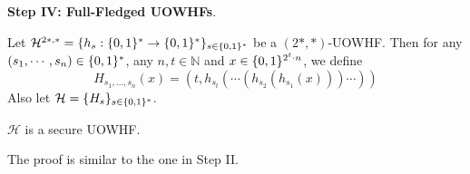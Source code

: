 \noindent\textbf{Step IV: Full-Fledged UOWHFs}. 
\begin{construction}[(a UOWHF)]
Let $\mathcal{H}^{2*, *} = \{h_s:\{0,1\}^{*}\rightarrow\{0,1\}^{*}\}_{s\in\{0,1\}^{*}}$ be a $(2*, *)$-UOWHF. Then for any $(s_1,\cdots,s_n) \in \{0,1\}^*$, any $n, t\in\mathbb{N}$ and $x\in\{0,1\}^{2^t\cdot n}$, we define
\[
    H_{s_1,\dots,s_n}(x)=(t,h_{s_t}(\cdots(h_{s_2}(h_{s_1}(x)))\cdots))
\]
Also let $\mathcal{H} = \{H_s\}_{s \in \{0,1\}^*}$.
\end{construction}
\begin{claim}
    $\mathcal{H}$ is a secure UOWHF.
\end{claim}
The proof is similar to the one in Step II.\\\\
